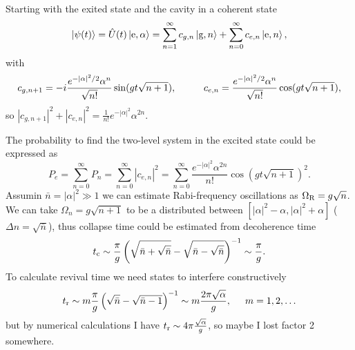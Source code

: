 Starting with the exited state and the cavity in a coherent state 
\begin{equation*}
	\left| \psi(t) \right\rangle = \hat{U}(t) \left| \text{e}, \alpha \right\rangle = \sum_{n=1}^{\infty} c_{g, n} \left| \text{g}, n \right\rangle + \sum_{n=0}^{\infty} c_{e, n} \left| \text{e}, n \right\rangle,
\end{equation*}
with 
\begin{equation*}
	c_{g, n+1} = -i \frac{e^{-|\alpha|^2/2} \alpha^n}{\sqrt{n!}}  \sin(gt \sqrt{n+1}),
	\hspace{10 mm} 
	c_{e, n} =  \frac{e^{-|\alpha|^2/2} \alpha^n}{\sqrt{n!}}  \cos(gt \sqrt{n+1}),
\end{equation*}
so $|c_{g, n+1}|^2 + |c_{e, n}|^2 = \tfrac{1}{n!}{e^{-|\alpha|^2} \alpha^{2n}}$. 

The probability  to find the two-level system in the excited state could be expressed as
\begin{equation*}
	P_e = \sum_{n=0}^{\infty} P_n = \sum_{n=0}^{\infty} |c_{e,n}|^2 = \sum_{n=0}^{\infty} \frac{e^{-|\alpha|^2} \alpha^{2n}}{n!} \cos(gt \sqrt{n+1})^2.
\end{equation*}
Assumin $\bar{n} = |\alpha|^2 \gg 1$ we can estimate Rabi-frequency oscillations as $\Omega_{\textnormal{R}} = g \sqrt{n}$. We can take $\Omega_n = g \sqrt{n+1}$ to be a distributed between $[|\alpha|^2 - \alpha, |\alpha|^2 + \alpha]$ ($\Delta n = \sqrt{\bar{n}}$), thus collapse time could be estimated from decoherence time
\begin{equation*}
	t_{\textnormal{c}} \sim \frac{\pi}{g}\left(
		 \sqrt{\bar{n}+\sqrt{\bar{n}}} - \sqrt{\bar{n}-\sqrt{\bar{n}}}
	\right)^{-1} \sim \frac{\pi}{g}.
\end{equation*}
To calculate revival time we need states to interfere constructively
\begin{equation*}
	t_{\textnormal{r}} \sim m \frac{\pi}{g} \left(\sqrt{\bar{n}} - \sqrt{\bar{n}-1}\right)^{-1} \sim m \frac{2 \pi \sqrt{\alpha}}{g},
	\hspace{5 mm} 
	m = 1,2,\ldots
\end{equation*}
but by numerical calculations I have $t_{\textnormal{r}} \sim 4 \pi \frac{\sqrt{\alpha}}{g}$, so maybe I lost factor 2 somewhere.